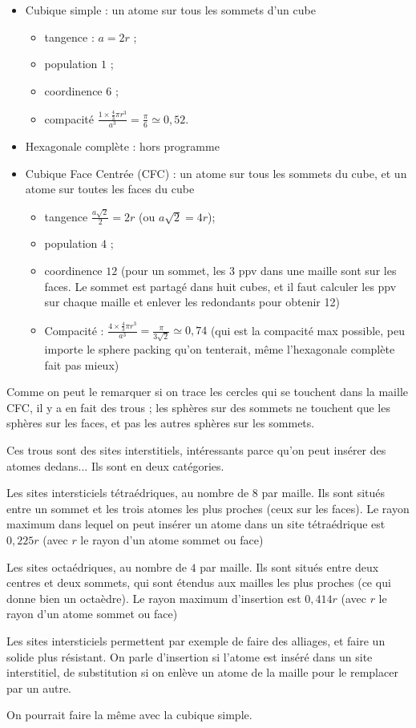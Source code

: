 \documentclass[a4paper,12pt]{book}
\newcommand{\Def}[2]{\begin{tcolorbox}[colback=white,colframe=red!10!green!20!blue!75!, title=Définition : #1]#2\end{tcolorbox}}
\newcommand{\Thr}[2]{\begin{tcolorbox}[sharp corners, colback=white,colframe=red!10!blue!30!green!75!, title=Théorème : #1]#2\end{tcolorbox}}
\begin{document}
\Def{Types de mailles}{\begin{itemize}
\item Cubique simple : un atome sur tous les sommets d'un cube \begin{itemize}
    \item tangence : $a=2r$ ;
    \item population $1$ ;
    \item coordinence $6$ ;
    \item compacité $\frac{1 \times \frac{4}{3}\pi r^3}{a^3} =\frac{\pi}{6}\simeq 0,52$.
\end{itemize}
\item Hexagonale complète : hors programme
\item Cubique Face Centrée (CFC) : un atome sur tous les sommets du cube, et un atome sur toutes les faces du cube\begin{itemize}
    \item tangence $\frac{a\sqrt{2}}{2} = 2r$  (ou $a\sqrt{2} = 4r$);
    \item population $4$ ;
    \item coordinence $12$ (pour un sommet, les 3 ppv dans une maille sont sur les faces. Le sommet est partagé dans huit cubes, et il faut calculer les ppv sur chaque maille et enlever les redondants pour obtenir 12)
    \item Compacité : $\frac{4 \times \frac{4}{3}\pi r^3}{a^3} = \frac{\pi}{3\sqrt{2}}\simeq 0,74$ (qui est la compacité max possible, peu importe le sphere packing qu'on tenterait, même l'hexagonale complète fait pas mieux)
\end{itemize}
\end{itemize}}

\Thr{Sites intersticiels (CFC)}{Comme on peut le remarquer si on trace les cercles qui se touchent dans la maille CFC, il y a en fait des trous ; les sphères sur des sommets ne touchent que les sphères sur les faces, et pas les autres sphères sur les sommets.
\par Ces trous sont des sites interstitiels, intéressants parce qu'on peut insérer des atomes dedans... Ils sont en deux catégories.
\par Les sites intersticiels tétraédriques, au nombre de $8$ par maille. Ils sont situés entre un sommet et les trois atomes les plus proches (ceux sur les faces). Le rayon maximum dans lequel on peut insérer un atome dans un site tétraédrique est $0,225r$ (avec $r$ le rayon d'un atome sommet ou face)
\par Les sites octaédriques, au nombre de $4$ par maille. Ils sont situés entre deux centres et deux sommets, qui sont étendus aux mailles les plus proches (ce qui donne bien un octaèdre). Le rayon maximum d'insertion est $0,414r$ (avec $r$ le rayon d'un atome sommet ou face)
\par Les sites intersticiels permettent par exemple de faire des alliages, et faire un solide plus résistant. On parle d'insertion si l'atome est inséré dans un site interstitiel, de substitution si on enlève un atome de la maille pour le remplacer par un autre.
\par On pourrait faire la même avec la cubique simple.}
\end{document}
